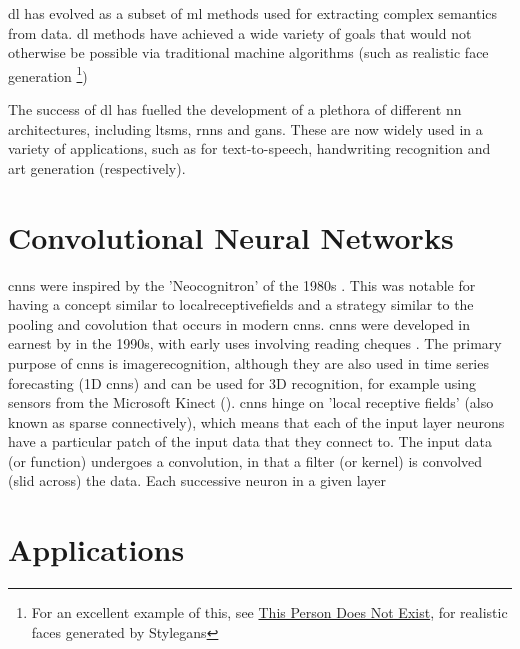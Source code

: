 \gls{dl} has evolved as a subset of \gls{ml} methods used for extracting complex semantics from data. \gls{dl} methods have achieved a wide variety of goals that would not otherwise be possible via traditional machine algorithms (such as realistic face generation \footnote{For an excellent example of this, see \href{https://www.thispersondoesnotexist.com/}{This Person Does Not Exist}, for realistic faces generated by Style\gls{gan}s})  \bigskip

The success of  \gls{dl} has fuelled the development of a plethora of different \gls{nn} architectures, including \gls{ltsm}s, \gls{rnn}s and \gls{gan}s. These are now widely used in a variety of applications, such as for text-to-speech, handwriting recognition and art generation (respectively).  
\bigskip %

\section{Convolutional Neural Networks}

\gls{cnn}s were inspired by the 'Neocognitron' of the 1980s \cite{neocognitron_proposal} \cite{neocognitron}. This was notable for having a concept similar to \gls{localreceptivefields} and a strategy similar to the pooling and covolution that occurs in modern \gls{cnn}s. \gls{cnn}s were developed in earnest by in the 1990s, with early uses involving reading cheques \cite{LeNet}. The primary purpose of \gls{cnn}s is \gls{imagerecognition}, although they are also used in time series forecasting (1D \gls{cnn}s) and can be used for 3D recognition, for example using sensors from the Microsoft Kinect (\cite{3d_conv}). \gls{cnn}s hinge on 'local receptive fields' (also known as sparse connectively), which means that each of the input layer neurons have a particular patch of the input data that they connect to. The input data (or function) undergoes a convolution, in that a filter (or kernel) is convolved (slid across) the data. Each successive \gls{neuron} in a given layer \cite[Chapter~5]{good_fellow_2016}



\section{Applications}

